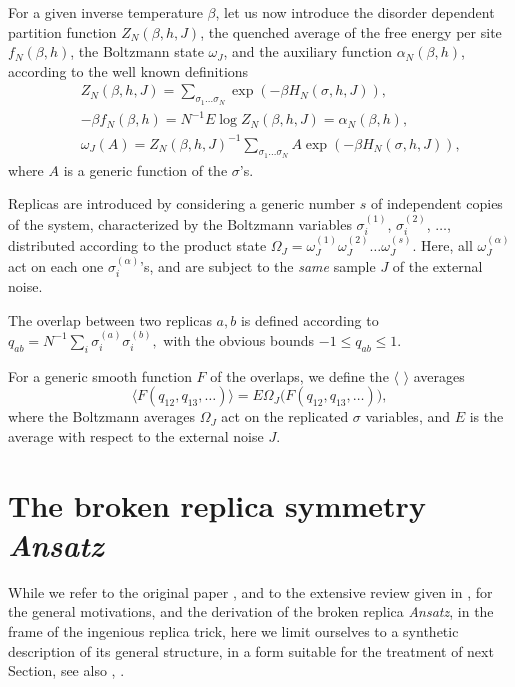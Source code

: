\documentclass[a4paper,12pt]{article}
\begin{document}
For a given inverse temperature $\beta$, let us now introduce the 
disorder dependent
partition function $Z_{N}(\beta,h,J)$, 
the quenched average of the free energy per site
$f_{N}(\beta,h)$, the Boltzmann state 
$\omega_J$, and the auxiliary function $\alpha_N(\beta,h)$,  
according to the well known definitions
\begin{eqnarray}\label{Z}
&&Z_N(\beta,h,J)=\sum_{\sigma_1\dots\sigma_N}\exp(-\beta H_N(\sigma,h,J)),\\
\label{f}
&&-\beta f_N(\beta,h)=N^{-1} E\log Z_N(\beta,h,J)=\alpha_N(\beta,h),\\
\label{state}
&&\omega_{J}(A)=Z_N(\beta,h,J)^{-1}\sum_{\sigma_1\dots\sigma_N}A\exp(-\beta
H_N(\sigma,h,J)), 
\end{eqnarray}
where $A$ is a generic function of the $\sigma$'s. 

Replicas are introduced by 
considering a generic number $s$ of independent copies
of the system, characterized by the Boltzmann
variables $\sigma^{(1)}_i$, $\sigma^{(2)}_i$, $\dots$,
distributed according to the product state 
$\Omega_J=\omega^{(1)}_J \omega^{(2)}_J \dots\omega^{(s)}_J$. Here,
all $\omega^{(\alpha)}_J$ act on each one
$\sigma^{(\alpha)}_i$'s, and are subject to the {\sl
same} sample $J$ of the external noise. 

The overlap between  two replicas $a,b$ is
defined according to
$q_{ab}=
N^{-1}\sum_{i}\sigma^{(a)}_i\sigma^{(b)}_i,$
with the obvious bounds
$-1\le q_{ab}\le 1$.

For a generic smooth function $F$ of the overlaps, we
define the $\langle\,\,\rangle$ averages
\begin{equation}
\label{medie}
\langle F(q_{12},q_{13},\dots)\rangle=
E\Omega_J\bigl(F(q_{12},q_{13},\dots)\bigr),
\end{equation}
where the Boltzmann averages $\Omega_J$ act on the replicated $\sigma$
variables, and $E$ is the average with respect to the external noise $J$.

\section{The broken replica symmetry  {\bf \it Ansatz}}

While we refer to the original paper \cite{P}, and to the extensive 
review given in \cite{MPV}, for the general motivations, and the 
derivation of the broken replica  {\it Ansatz}, in the frame of the 
ingenious replica trick, here we limit ourselves to a synthetic 
description of its general structure, in a form suitable for the treatment 
of next Section, see also \cite{Glocarno}, \cite{BR}.
\end{document}
